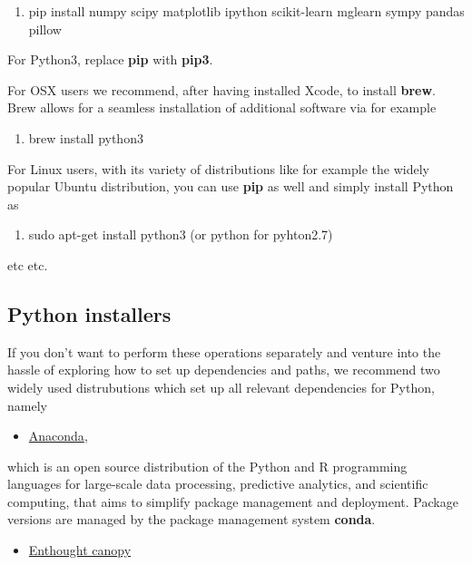 \documentclass[%
oneside,                 %
final,                   %
10pt]{article}
\begin{document}
\begin{enumerate}
\item pip install numpy scipy matplotlib ipython scikit-learn mglearn sympy pandas pillow 
\end{enumerate}

\noindent
For Python3, replace \textbf{pip} with \textbf{pip3}.

For OSX users we recommend, after having installed Xcode, to
install \textbf{brew}. Brew allows for a seamless installation of additional
software via for example 

\begin{enumerate}
\item brew install python3
\end{enumerate}

\noindent
For Linux users, with its variety of distributions like for example the widely popular Ubuntu distribution,
you can use \textbf{pip} as well and simply install Python as 

\begin{enumerate}
\item sudo apt-get install python3  (or python for pyhton2.7)
\end{enumerate}

\noindent
etc etc. 



\subsection{Python installers}

If you don't want to perform these operations separately and venture
into the hassle of exploring how to set up dependencies and paths, we
recommend two widely used distrubutions which set up all relevant
dependencies for Python, namely 

\begin{itemize}
\item \href{{https://docs.anaconda.com/}}{Anaconda}, 
\end{itemize}

\noindent
which is an open source
distribution of the Python and R programming languages for large-scale
data processing, predictive analytics, and scientific computing, that
aims to simplify package management and deployment. Package versions
are managed by the package management system \textbf{conda}. 

\begin{itemize}
\item \href{{https://www.enthought.com/product/canopy/}}{Enthought canopy} 
\end{itemize}
\end{document}
